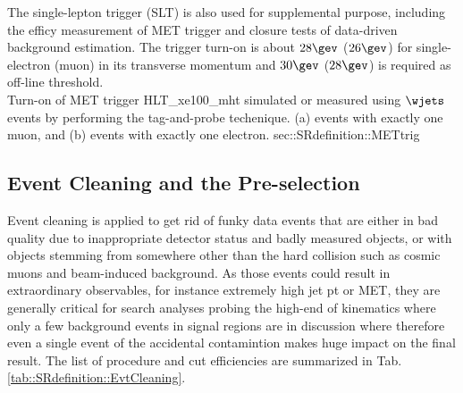 
The single-lepton trigger (SLT) is also used for supplemental purpose, including the efficy measurement of MET trigger and closure tests of data-driven background estimation. The trigger turn-on is about $28\gev$ ($26\gev$) for single-electron (muon) in its transverse momentum and $30\gev$ ($28\gev$) is required as off-line threshold. \\


{Turn-on of MET trigger HLT\_xe100\_mht simulated or measured using $\wjets$ events by performing the tag-and-probe techenique. (a) events with exactly one muon, and (b) events with exactly one electron.}
{sec::SRdefinition::METtrig}








\subsection{Event Cleaning and the Pre-selection} \label{sec::SRdefinition::eventCleaning}
Event cleaning is applied to get rid of funky data events that are either in bad quality due to inappropriate detector status and badly measured objects, or with objects stemming from somewhere other than the hard collision such as cosmic muons and beam-induced background. 
As those events could result in extraordinary observables, for instance extremely high jet pt or MET, they are generally critical for search analyses probing the high-end of kinematics where only a few background events in signal regions are in discussion where therefore even a single event of the accidental contamintion makes huge impact on the final result. The list of procedure and cut efficiencies are summarized in Tab. \ref{tab::SRdefinition::EvtCleaning}. 


